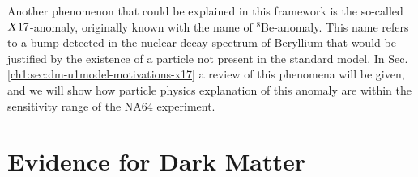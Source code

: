 Another phenomenon that could be explained in this framework is the so-called $X17$-anomaly, originally known with the name of $^8$Be-anomaly. This name refers to a bump detected in the nuclear decay spectrum of Beryllium that would be justified by the existence of a particle not present in the standard model. In Sec.\ref{ch1:sec:dm-u1model-motivations-x17} a review of this phenomena will be given, and we will show how particle physics explanation of this anomaly are within the sensitivity range of the NA64 experiment.


\section{Evidence for Dark Matter}
\label{ch1:sec:dm-evidence}

